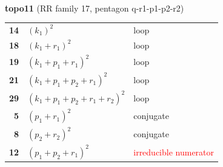 \documentclass[10pt]{article}
\begin{document}
\begin{minipage}[t]{0.48\textwidth}
{}\\[2mm]\textbf{topo11} (RR family 17, pentagon q-r1-p1-p2-r2)\\[2pt]{\footnotesize\begin{tabular}{@{}r@{\ \ }l@{\ \ }l@{}}\textbf{14} & $(k_1)^2$ & loop\\
\textbf{18} & $(k_1+r_1)^2$ & loop\\
\textbf{19} & $(k_1+p_1+r_1)^2$ & loop\\
\textbf{21} & $(k_1+p_1+p_2+r_1)^2$ & loop\\
\textbf{29} & $(k_1+p_1+p_2+r_1+r_2)^2$ & loop\\
\textbf{5} & $(p_1+r_1)^2$ & conjugate\\
\textbf{8} & $(p_2+r_2)^2$ & conjugate\\
\textbf{12} & $(p_1+p_2+r_1)^2$ & \textcolor{red}{irreducible numerator}\\\end{tabular}}\end{minipage}\hfill%
\end{document}
